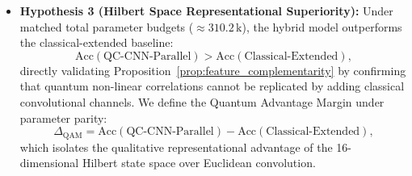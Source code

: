 \documentclass[pdflatex,sn-mathphys-num]{sn-jnl}%
\theoremstyle{thmstyleone}%
\theoremstyle{thmstyletwo}%
\theoremstyle{thmstylethree}%
\begin{document}
\begin{itemize}
    \item \textbf{Hypothesis 3 (Hilbert Space Representational Superiority):} Under matched total parameter budgets ($\approx 310.2\,\text{k}$), the hybrid model outperforms the classical-extended baseline:
    \begin{equation}
    \mathrm{Acc}(\text{QC-CNN-Parallel}) > \mathrm{Acc}(\text{Classical-Extended}),
    \label{eq:hyp_superiority}
    \end{equation}
    directly validating Proposition~\ref{prop:feature_complementarity} by confirming that quantum non-linear correlations cannot be replicated by adding classical convolutional channels. We define the Quantum Advantage Margin under parameter parity:
    \begin{equation}
    \Delta_{\mathrm{QAM}} = \mathrm{Acc}(\text{QC-CNN-Parallel}) - \mathrm{Acc}(\text{Classical-Extended}),
    \label{eq:qam_metric_def}
    \end{equation}
    which isolates the qualitative representational advantage of the 16-dimensional Hilbert state space over Euclidean convolution.
\end{itemize}
\end{document}
